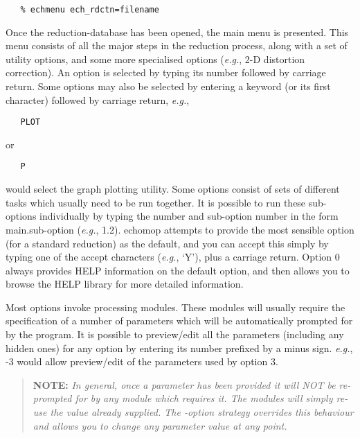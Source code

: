 \begin{verbatim}
   % echmenu ech_rdctn=filename
\end{verbatim}

Once the reduction-database has been opened, the main menu is
presented.  This menu consists of all the major steps in the reduction
process, along with a set of utility options, and some more specialised
options ({\it{e.g.}}, 2-D distortion correction).   An option is selected by typing its number followed by carriage
return.  Some options may also be selected by entering a keyword (or its
first character) followed by carriage return, {\it{e.g.}},

\begin{verbatim}
   PLOT
\end{verbatim}

or

\begin{verbatim}
   P
\end{verbatim}

would select the graph plotting utility.  Some options consist of sets of
different tasks which usually need to be run together.  It is possible to
run these sub-options individually by typing the number and sub-option
number in the form main.sub-option  ({\it{e.g.}}, 1.2).
 {\sc echomop} attempts to provide the most
sensible option (for a standard reduction) as the default, and you
can accept this simply by typing one of the accept characters ({\it{e.g.}},
`Y'), plus a carriage return.  Option 0 always
provides HELP information on the default option, and then allows you
to browse the HELP library for more detailed information.

Most options invoke processing modules.  These modules will usually
require the specification of a number of parameters which will be
automatically prompted for by the program.  It is possible to
preview/edit all the parameters (including any hidden ones) for any
option by entering its number prefixed by a minus sign. {\it{e.g.}},
-3 would allow preview/edit of the parameters used by option 3.

\begin{quote}

  {\bf NOTE:} {\sl In general, once a parameter has been provided
  it will NOT be re-prompted for by any module which requires it.
  The modules will simply re-use the value already supplied. The -option
  strategy overrides this behaviour and allows you to change any
  parameter value at any point.}

\end{quote}

